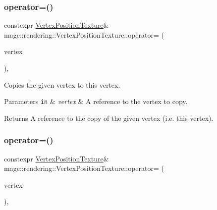 \subsubsection{\texorpdfstring{operator=()}{operator=()}\hspace{0.1cm}{\footnotesize\ttfamily [1/2]}}
{\footnotesize\ttfamily constexpr \mbox{\hyperlink{structmage_1_1rendering_1_1_vertex_position_texture}{Vertex\+Position\+Texture}}\& mage\+::rendering\+::\+Vertex\+Position\+Texture\+::operator= (\begin{DoxyParamCaption}\item[{const \mbox{\hyperlink{structmage_1_1rendering_1_1_vertex_position_texture}{Vertex\+Position\+Texture}} \&}]{vertex }\end{DoxyParamCaption})\hspace{0.3cm}{\ttfamily [default]}, {\ttfamily [noexcept]}}

Copies the given vertex to this vertex.


\begin{DoxyParams}[1]{Parameters}
\mbox{\tt in}  & {\em vertex} & A reference to the vertex to copy. \\
\hline
\end{DoxyParams}
\begin{DoxyReturn}{Returns}
A reference to the copy of the given vertex (i.\+e. this vertex). 
\end{DoxyReturn}
\mbox{\label{structmage_1_1rendering_1_1_vertex_position_texture_a6bf7ada3b933e5790349225ee323db36}} 
\subsubsection{\texorpdfstring{operator=()}{operator=()}\hspace{0.1cm}{\footnotesize\ttfamily [2/2]}}
{\footnotesize\ttfamily constexpr \mbox{\hyperlink{structmage_1_1rendering_1_1_vertex_position_texture}{Vertex\+Position\+Texture}}\& mage\+::rendering\+::\+Vertex\+Position\+Texture\+::operator= (\begin{DoxyParamCaption}\item[{\mbox{\hyperlink{structmage_1_1rendering_1_1_vertex_position_texture}{Vertex\+Position\+Texture}} \&\&}]{vertex }\end{DoxyParamCaption})\hspace{0.3cm}{\ttfamily [default]}, {\ttfamily [noexcept]}}

